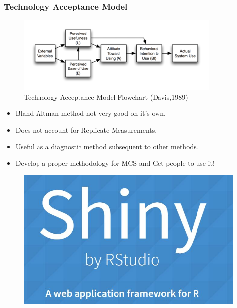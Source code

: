 \documentclass[compress]{beamer}        %
\begin{document}
		\begin{frame}
			\frametitle{Technology Acceptance Model}
			
			\begin{figure}
				\centering
				\includegraphics[width=0.89\linewidth]{images/TechAccept}
				\caption{Technology Acceptance Model Flowchart (Davis,1989)}
				\label{fig:TechAccept}
			\end{figure}
			
		\end{frame}
		
		\begin{frame}
			\Large
			\begin{itemize}
				\item Bland-Altman method not very good on it's own.
				\item Does not account for Replicate Measurements.
				\item Useful as a diagnostic method subsequent to other methods.
				\item Develop a proper methodology for MCS and Get people to use it!
			\end{itemize}
		\end{frame}
		
		\begin{frame}
			\begin{figure}
				\centering
				\includegraphics[width=0.99\linewidth]{images/SHINY}
			\end{figure}
			
		\end{frame}
		
\end{document}
